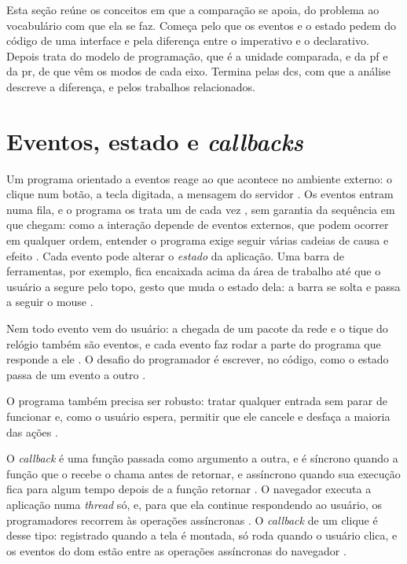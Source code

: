 Esta seção reúne os conceitos em que a comparação se apoia, do problema ao
vocabulário com que ela se faz.
Começa pelo que os eventos e o estado pedem do código de uma interface e
pela diferença entre o imperativo e o declarativo.
Depois trata do modelo de programação, que é a unidade comparada, e da
\gls{pf} e da \gls{pr}, de que vêm os modos de cada eixo.
Termina pelas \glspl{dc}, com que a análise descreve a diferença, e pelos
trabalhos relacionados.
\section{Eventos, estado e \emph{callbacks}}
\label{sec:eventos-estado-e-callbacks}

Um programa orientado a eventos reage ao que acontece no ambiente externo: o
clique num botão, a tecla digitada, a mensagem do servidor
\cite[p. 86:1]{madsen2017}.
Os eventos entram numa fila, e o programa os trata um de cada vez
\cite[p. 86:1]{madsen2017}, sem garantia da sequência em que chegam:
como a interação depende de eventos externos, que podem ocorrer em
qualquer ordem, entender o programa exige seguir várias cadeias de causa
e efeito \cite[p. 125]{martin2022}.
Cada evento pode alterar o \emph{estado} da aplicação.
Uma barra de ferramentas, por exemplo, fica encaixada acima da área de
trabalho até que o usuário a segure pelo topo, gesto que muda o estado
dela: a barra se solta e passa a seguir o mouse \cite[p. 230]{oney2012}.

Nem todo evento vem do usuário: a chegada de um pacote da rede e o tique do
relógio também são eventos, e cada evento faz rodar a parte do programa que
responde a ele \cite[p. 8]{krishnamurthi2019}.
O desafio do programador é escrever, no código, como o estado passa de um
evento a outro \cite[p. 8]{krishnamurthi2019}.

O programa também precisa ser robusto: tratar qualquer entrada sem parar
de funcionar e, como o usuário espera, permitir que ele cancele e desfaça
a maioria das ações \cite[p. 75, 79 e 80]{myers1994}.

O \emph{callback} é uma função passada como argumento a outra, e é síncrono
quando a função que o recebe o chama antes de retornar, e assíncrono
quando sua execução fica para algum tempo depois de a função retornar
\cite[p. 2]{gallaba2015}.
O navegador executa a aplicação numa \emph{thread} só, e, para que ela continue
respondendo ao usuário, os programadores recorrem às operações assíncronas
\cite[p. 368-369]{alimadadi2014}.
O \emph{callback} de um clique é desse tipo: registrado quando a tela é montada,
só roda quando o usuário clica, e os eventos do \gls{dom} estão entre as
operações assíncronas do navegador \cite[p. 5]{gallaba2015}.

